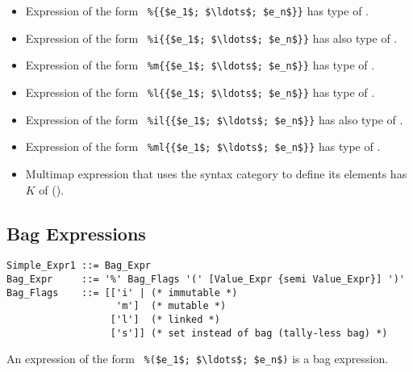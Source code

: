 \begin{itemize}
  \item Expression of the form ~\lstinline!%{{$e_1$; $\ldots$; $e_n$}}!
    has type of . 
  \item Expression of the form ~\lstinline!%i{{$e_1$; $\ldots$; $e_n$}}!
    has also type of . 
  \item Expression of the form ~\lstinline!%m{{$e_1$; $\ldots$; $e_n$}}!
    has type of .
  \item Expression of the form ~\lstinline!%l{{$e_1$; $\ldots$; $e_n$}}!
    has type of . 
  \item Expression of the form ~\lstinline!%il{{$e_1$; $\ldots$; $e_n$}}!
    has also type of . 
  \item Expression of the form ~\lstinline!%ml{{$e_1$; $\ldots$; $e_n$}}!
    has type of .
  \item Multimap expression that uses the  syntax category to define its elements has $K$ of  (). 
\end{itemize}






\subsection{Bag Expressions}
\label{sec:bag-expressions}

\syntax\begin{lstlisting}
Simple_Expr1 ::= Bag_Expr
Bag_Expr     ::= '%' Bag_Flags '(' [Value_Expr {semi Value_Expr}] ')'
Bag_Flags    ::= [['i' | (* immutable *)
                   'm']  (* mutable *)
                  ['l']  (* linked *)
                  ['s']] (* set instead of bag (tally-less bag) *)
\end{lstlisting}

An expression of the form ~\lstinline!%($e_1$; $\ldots$; $e_n$)! is a bag expression. 

